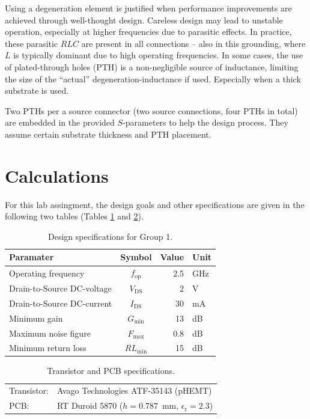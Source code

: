 \documentclass[a4paper, 12pt]{article}
\newlength{\oneLine}
\newcommand{\m}[1]{\mathrm{#1}}
\begin{document}
Using a degeneration element is justified when performance improvements are achieved through 
well-thought design. Careless design may lead to unstable operation, especially at higher 
frequencies due to parasitic effects. In practice, these parasitic $RLC$ are present in 
all connections -- also in this grounding, where $L$ is typically dominant due to high 
operating frequencies. In some cases, the use of plated-through holes (PTH) is a non-negligible 
source of inductance, limiting the size of the ``actual'' degeneration-inductance if used. 
Especially when a thick substrate is used.

Two PTHs per a source connector (two source connections, four PTHs in total) are embedded in 
the provided $S$-parameters to help the design process. They assume certain substrate 
thickness and PTH placement.


\newpage
\section{Calculations}

For this lab assingment, the design goals and other specifications are given in the following 
two tables (Tables \ref{t:p1} and \ref{t:p2}).

\begin{table}[!h]
	\begin{center}
		\caption{Design specifications for Group 1.}
		\label{t:p1}
		\renewcommand{\arraystretch}{1.2}
		\begin{tabular}{lcrl}
			Paramater					& Symbol						& Value		& Unit 	\\
			\hline
			Operating frequency			& $f_\mathrm{op}$				& 2.5		& GHz 	\\
			Drain-to-Source DC-voltage	& $V_\mathrm{DS}$				& 2			& V 	\\
			Drain-to-Source DC-current	& $I_\mathrm{DS}$				& 30		& mA 	\\
			Minimum gain				& $G_\mathrm{min}$				& 13		& dB 	\\
			Maximum noise figure		& $F_\mathrm{max}$				& 0.8		& dB 	\\
			Minimum return loss			& $\mathit{RL}_\mathrm{min}$	& 15		& dB 
		\end{tabular}
	\end{center}
	\vspace{-\oneLine}
\end{table}

\begin{table}[!h]
	\begin{center}
		\caption{Transistor and PCB specifications.}
		\label{t:p2}
		\renewcommand{\arraystretch}{1.2}
		\begin{tabular}{ll}
			Transistor:	& Avago Technologies ATF-35143 (pHEMT) \\
			PCB:		& RT Duroid 5870 ($h = 0.787$~mm, $\epsilon_\m{r} = 2.3$)
		\end{tabular}
	\end{center}
	\vspace{-\oneLine}
\end{table}
\end{document}

